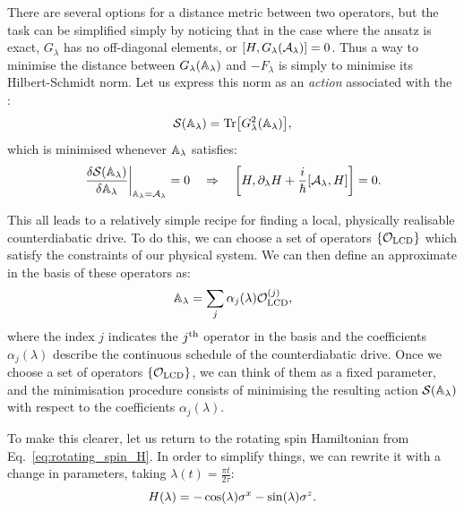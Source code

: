     There are several options for a distance metric between two operators, but the task can be simplified simply by noticing that in the case where the ansatz is exact, $G_{\lambda}$ has no off-diagonal elements, or $\comm{H}{G_{\lambda}(\AGP{\lambda})} = 0$. Thus a way to minimise the distance between $G_{\lambda}(\mathbb{A}_{\lambda})$ and $-F_{\lambda}$ is simply to minimise its Hilbert-Schmidt norm. Let us express this norm as an \emph{action}\cite{kolodrubetz_geometry_2017} associated with the :
    \begin{equation}\label{eq:agp_action}
        \mathcal{S}(\mathbb{A}_{\lambda}) = \Tr[G^2_{\lambda}(\mathbb{A}_{\lambda})],
    \end{equation}
    which is minimised whenever $\mathbb{A}_{\lambda}$ satisfies:
    \begin{equation}
        \left. \frac{\delta \mathcal{S}(\approxAGP)}{\delta \approxAGP} \right\vert_{\approxAGP = \AGP{\lambda}} = 0 \quad \Rightarrow \quad \left[ H, \dlambda H + \frac{i}{\hbar}\comm{\AGP{\lambda}}{H} \right] = 0.
    \end{equation}

    This all leads to a relatively simple recipe for finding a local, physically realisable counterdiabatic drive. To do this, we can choose a set of operators $\{\mathcal{O}_{\rm LCD}\}$ which satisfy the constraints of our physical system. We can then define an approximate  in the basis of these operators as:
    \begin{equation}\label{eq:LCD_basis}
        \mathbb{A}_{\lambda} = \sum_j \alpha_j (\lambda) \mathcal{O}_{\rm LCD}^{(j)},
    \end{equation}
    where the index $j$ indicates the $j^{\rm th}$ operator in the basis and the coefficients $\alpha_j(\lambda)$ describe the continuous schedule of the counterdiabatic drive. Once we choose a set of operators $\{\mathcal{O}_{\rm LCD}\}$, we can think of them as a fixed parameter, and the minimisation procedure consists of minimising the resulting action $\mathcal{S}(\mathbb{A}_{\lambda})$ with respect to the coefficients $\alpha_j(\lambda)$.

    To make this clearer, let us return to the rotating spin Hamiltonian from Eq.~\eqref{eq:rotating_spin_H}. In order to simplify things, we can rewrite it with a change in parameters, taking $\lambda(t) = \frac{\pi t}{2 \tau}$:
    \begin{equation}\label{eq:rotating_spin_H_lambda}
        H(\lambda) = -\cos(\lambda)\sigma^x - \sin(\lambda)\sigma^z.
    \end{equation}

